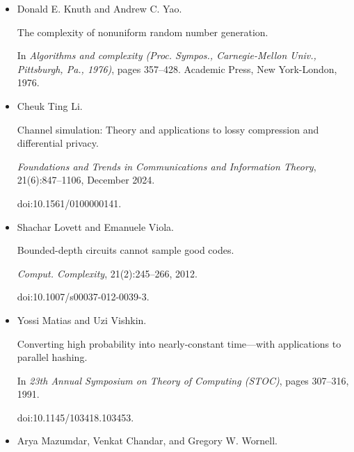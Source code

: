 \begin{itemize}
Symmetric distributions from shallow circuits, 2025.


doi:10.48550/arXiv.2511.14127.





\item[] 
[31]

Donald E. Knuth and Andrew C. Yao.


The complexity of nonuniform random number generation.


In \emph{Algorithms and complexity (Proc. Sympos., Carnegie-Mellon
Univ., Pittsburgh, Pa., 1976)}, pages 357–428. Academic Press, New
York-London, 1976.





\item[] 
[32]

Cheuk Ting Li.


Channel simulation: Theory and applications to lossy compression and
differential privacy.


\emph{Foundations and Trends in Communications and Information
Theory}, 21(6):847–1106, December 2024.


doi:10.1561/0100000141.





\item[] 
[33]

Shachar Lovett and Emanuele Viola.


Bounded-depth circuits cannot sample good codes.


\emph{Comput. Complexity}, 21(2):245–266, 2012.


doi:10.1007/s00037-012-0039-3.





\item[] 
[34]

Yossi Matias and Uzi Vishkin.


Converting high probability into nearly-constant time—with
applications to parallel hashing.


In \emph{23th Annual Symposium on Theory of Computing (STOC)}, pages
307–316, 1991.


doi:10.1145/103418.103453.





\item[] 
[35]

Arya Mazumdar, Venkat Chandar, and Gregory W. Wornell.



\end{itemize}
